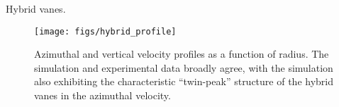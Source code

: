 \label{app-validation}

Hybrid vanes.
\begin{figure}[!htb]
  \begin{center}
   \texttt{[image: figs/hybrid\_profile]}
   \caption{Azimuthal and vertical velocity profiles as a function of
   radius. The simulation and experimental data broadly agree, with
   the simulation also exhibiting the characteristic ``twin-peak''
   structure of the hybrid vanes in the azimuthal velocity. }
   \label{fig:lab}
  \end{center}
\end{figure}


